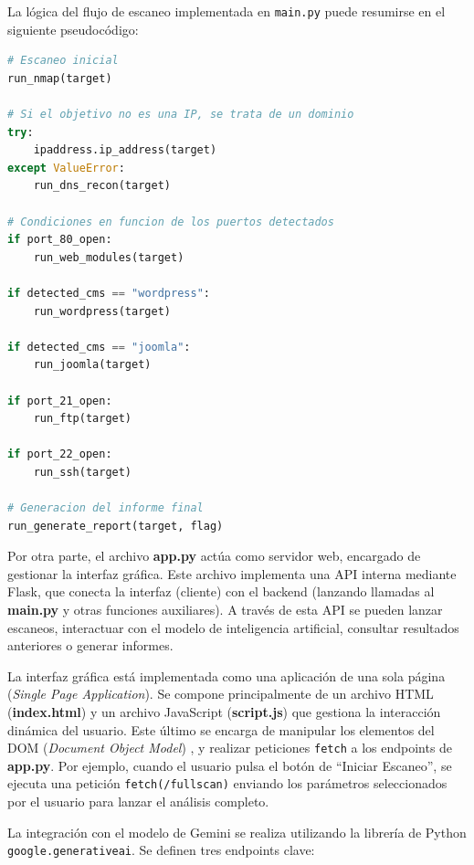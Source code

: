 \begin{parskipenv}
\medskip

La lógica del flujo de escaneo implementada en \texttt{main.py} puede resumirse en el siguiente pseudocódigo:

\begin{lstlisting}[language=Python, caption={Pseudocódigo del archivo \textit{main.py}}]
# Escaneo inicial
run_nmap(target)

# Si el objetivo no es una IP, se trata de un dominio
try:
    ipaddress.ip_address(target)
except ValueError:
    run_dns_recon(target)

# Condiciones en funcion de los puertos detectados
if port_80_open:
    run_web_modules(target)

if detected_cms == "wordpress":
    run_wordpress(target)

if detected_cms == "joomla":
    run_joomla(target)

if port_21_open:
    run_ftp(target)

if port_22_open:
    run_ssh(target)

# Generacion del informe final
run_generate_report(target, flag)
\end{lstlisting}

\medskip

Por otra parte, el archivo \textbf{app.py} actúa como servidor web, encargado de gestionar la interfaz gráfica. Este archivo implementa una API interna mediante Flask, que conecta la interfaz (cliente) con el backend (lanzando llamadas al \textbf{main.py} y otras funciones auxiliares). A través de esta API se pueden lanzar escaneos, interactuar con el modelo de inteligencia artificial, consultar resultados anteriores o generar informes.

La interfaz gráfica está implementada como una aplicación de una sola página (\textit{Single Page Application}). Se compone principalmente de un archivo HTML (\textbf{index.html}) y un archivo JavaScript (\textbf{script.js}) que gestiona la interacción dinámica del usuario. Este último se encarga de manipular los elementos del DOM (\textit{Document Object Model}) \cite{wikipedia_dom}, y realizar peticiones \texttt{fetch} a los endpoints de \textbf{app.py}. Por ejemplo, cuando el usuario pulsa el botón de ``Iniciar Escaneo'', se ejecuta una petición \texttt{fetch(/fullscan)} enviando los parámetros seleccionados por el usuario para lanzar el análisis completo.

La integración con el modelo de Gemini se realiza utilizando la librería de Python \texttt{google.generativeai}. Se definen tres endpoints clave:


\end{parskipenv}
